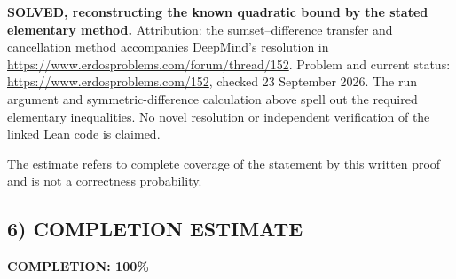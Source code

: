 \textbf{SOLVED, reconstructing the known quadratic bound by the stated elementary method.} Attribution: the sumset--difference transfer and cancellation method accompanies DeepMind's resolution in \url{https://www.erdosproblems.com/forum/thread/152}. Problem and current status: \url{https://www.erdosproblems.com/152}, checked 23 September 2026. The run argument and symmetric-difference calculation above spell out the required elementary inequalities. No novel resolution or independent verification of the linked Lean code is claimed.

The estimate refers to complete coverage of the statement by this written proof and is not a correctness probability.
\subsection*{6) COMPLETION ESTIMATE}
\textbf{COMPLETION: 100\%}

